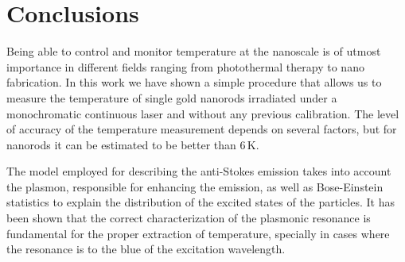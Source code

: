 \documentclass[journal=nalefd,manuscript=letter]{achemso}
\newcommand{\K}{\ensuremath{\,\textrm{K}}}
\newcommand{\nm}{\ensuremath{\,\textrm{nm}}}
\begin{document}
% 
% 

\section{Conclusions}
Being able to control and monitor temperature at the nanoscale is of utmost
importance in different fields ranging from photothermal therapy\cite{Huang2006}
to nano fabrication\cite{Fedoruk2013}. In this work we have shown a simple
procedure that allows us to measure the temperature of single gold nanorods
irradiated under a monochromatic continuous laser and without any previous
calibration. The level of accuracy of the temperature measurement depends on
several factors, but for nanorods it can be estimated to be better than $6\K$.

The model employed for describing the anti-Stokes emission takes into account
the plasmon, responsible for enhancing the emission, as well as Bose-Einstein
statistics to explain the distribution of the excited states of the particles.
It has been shown that the correct characterization of the plasmonic resonance is
fundamental for the proper extraction of temperature, specially in cases
where the resonance is to the blue of the excitation wavelength.
\end{document}
